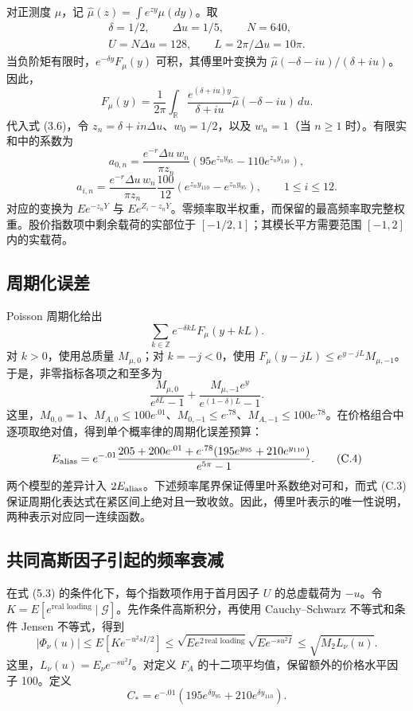 对正测度 \(\mu\)，记 \(\widehat\mu(z)=\int e^{zy}\mu(dy)\)。取
\[
\begin{gathered}
\delta=1/2,\qquad \Delta u=1/5,\qquad N=640,\\
U=N\Delta u=128,\qquad L=2\pi/\Delta u=10\pi.
\end{gathered}
\]
当负阶矩有限时，\(e^{-\delta y}F_\mu(y)\) 可积，其傅里叶变换为 \(\widehat\mu(-\delta-iu)/(\delta+iu)\)。因此，
\[
F_\mu(y)=\frac1{2\pi}\int_{\mathbb R}
\frac{e^{(\delta+iu)y}}{\delta+iu}\widehat\mu(-\delta-iu)\,du.
\tag{C.1}
\]
代入式 (3.6)，令 \(z_n=\delta+in\Delta u\)、\(w_0=1/2\)，以及 \(w_n=1\)（当 \(n\ge1\) 时）。有限实和中的系数为
\[
a_{0,n}=\frac{e^{-r}\Delta u\,w_n}{\pi z_n}
\left(95e^{z_ny_{95}}-110e^{z_ny_{110}}\right),
\]
\[
a_{i,n}=\frac{e^{-r}\Delta u\,w_n}{\pi z_n}\frac{100}{12}
\left(e^{z_ny_{110}}-e^{z_ny_{95}}\right),\qquad 1\le i\le12.
\tag{C.2}
\]
对应的变换为 \(Ee^{-z_nY}\) 与 \(Ee^{Z_i-z_nY}\)。零频率取半权重，而保留的最高频率取完整权重。股价指数项中剩余载荷的实部位于 \([-1/2,1]\)；其模长平方需要范围 \([-1,2]\) 内的实载荷。

\subsection{周期化误差}

Poisson 周期化给出
\[
\sum_{k\in\mathbb Z}e^{-\delta kL}F_\mu(y+kL).
\]
对 \(k>0\)，使用总质量 \(M_{\mu,0}\)；对 \(k=-j<0\)，使用 \(F_\mu(y-jL)\le e^{y-jL}M_{\mu,-1}\)。于是，非零指标各项之和至多为
\[
\frac{M_{\mu,0}}{e^{\delta L}-1}
+\frac{M_{\mu,-1}e^y}{e^{(1-\delta)L}-1}.
\tag{C.3}
\]
这里，\(M_{0,0}=1\)、\(M_{A,0}\le100e^{.01}\)、\(M_{0,-1}\le e^{.78}\)、\(M_{A,-1}\le100e^{.78}\)。在价格组合中逐项取绝对值，得到单个概率律的周期化误差预算：
\[
E_{\rm alias}=
e^{-.01}\frac{
205+200e^{.01}
+e^{.78}(195e^{y_{95}}+210e^{y_{110}})
}{e^{5\pi}-1}.
\tag{C.4}
\]
两个模型的差异计入 \(2E_{\rm alias}\)。下述频率尾界保证傅里叶系数绝对可和，而式 (C.3) 保证周期化表达式在紧区间上绝对且一致收敛。因此，傅里叶表示的唯一性说明，两种表示对应同一连续函数。

\subsection{共同高斯因子引起的频率衰减}

在式 (5.3) 的条件化下，每个指数项作用于首月因子 \(U\) 的总虚载荷为 \(-u\)。令 \(K=E[e^{\text{real loading}}\mid\mathcal G]\)。先作条件高斯积分，再使用 Cauchy--Schwarz 不等式和条件 Jensen 不等式，得到
\[
|\Phi_\nu(u)|
\le E[K e^{-u^2sI/2}]
\le\sqrt{E e^{2\,\text{real loading}}}
\sqrt{E e^{-su^2I}}
\le\sqrt{M_2L_\nu(u)}.
\tag{C.5}
\]
这里，\(L_\nu(u)=E_\nu e^{-su^2I}\)。对定义 \(F_A\) 的十二项平均值，保留额外的价格水平因子 100。定义
\[
C_*=
e^{-.01}\left(195e^{\delta y_{95}}+210e^{\delta y_{110}}\right).
\]

